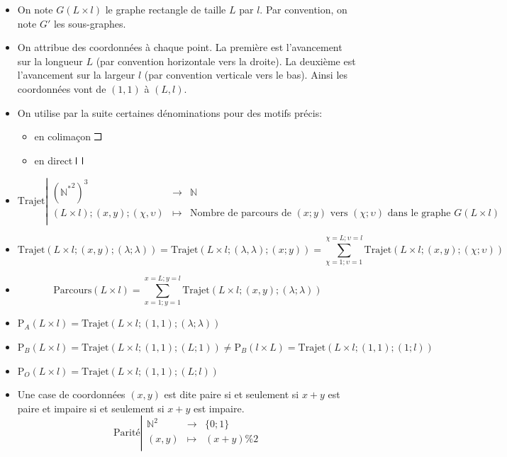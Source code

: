 \documentclass[twoside, a4paper, 12pt]{report}
\newcommand{\parcours}[2]{\ensuremath{\text{Parcours}(#1 \times #2)}}
\newcommand{\trajet}[6]{\ensuremath{\text{Trajet}\left(#1 \times #2; (#3, #4); (#5; #6)\right)}}
\newcommand{\pa}[2]{\ensuremath{\text{P}_A\left(#1 \times #2\right)}}
\newcommand{\pb}[2]{\ensuremath{\text{P}_B\left(#1 \times #2\right)}}
\newcommand{\po}[2]{\ensuremath{\text{P}_O\left(#1 \times #2\right)}}
\begin{document}
\begin{itemize}

\item On note $G(L \times l)$ le graphe rectangle de taille $L$ par $l$. Par convention, on note $G'$ les sous-graphes.
\item On attribue des coordonnées à chaque point. La première est l'avancement sur la longueur $L$ (par convention horizontale vers la droite). La deuxième est l'avancement sur la largeur $l$ (par convention verticale vers le bas). Ainsi les coordonnées vont de $(1,1)$ à $(L, l)$.

\item 
On utilise par la suite certaines dénominations pour des motifs précis:
\begin{itemize}
\item  en colimaçon \includegraphics[scale=1]{colimacon.png}
\item en direct \includegraphics[scale=1]{direct.png}
\end{itemize}

\item 
\[
\text{Trajet}
\left|
  \begin{array}{rcl}
    {\left(\mathbb{N^*}^2\right)}^3  &\longrightarrow & \mathbb{N} \\
    (L \times l); (x, y); (\chi, \upsilon) & \longmapsto& \text{Nombre de parcours de } (x; y) \text{ vers } (\chi; \upsilon) \text{ dans le graphe } G(L \times l)\\
  \end{array}
\right.
\]

\item \[\trajet{L}{l}{x}{y}{\lambda}{\lambda} = \trajet{L}{l}{\lambda}{\lambda}{x}{y}  = \sum_{\chi = 1; \upsilon = 1}^{\chi = L;\upsilon = l}\trajet{L}{l}{x}{y}{\chi}{\upsilon}\]
\item \[\parcours{L}{l} = \sum_{x = 1; y = 1}^{x = L; y = l}\trajet{L}{l}{x}{y}{\lambda}{\lambda}\]
\item $\pa{L}{l} = \trajet{L}{l}{1}{1}{\lambda}{\lambda}$
\item $\pb{L}{l} = \trajet{L}{l}{1}{1}{L}{1} \not= \pb{l}{L} = \trajet{L}{l}{1}{1}{1}{l}$
\item $\po{L}{l} = \trajet{L}{l}{1}{1}{L}{l}$

\item Une case de coordonnées $(x, y)$ est dite paire si et seulement si $x + y$ est paire et impaire si et seulement si $x + y$ est impaire.
 \[
\text{Parité}
\left|
  \begin{array}{rcl}
    \mathbb{N}^2  &\longrightarrow &\{0; 1\} \\
    (x, y) & \longmapsto& (x + y) \% 2\\
  \end{array}
\right.
\]


\end{itemize}
\end{document}
